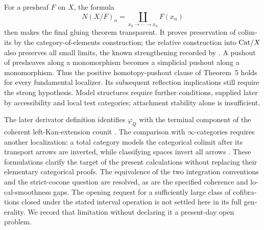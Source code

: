 \begin{otherlanguage}{english}
For a presheaf $F$ on $X$, the formula
\[
 N(X/F)_n=\coprod_{x_0\to\cdots\to x_n}F(x_n)
\]
then makes the final gluing theorem transparent. It proves preservation of colimits by the category-of-elements construction; the relative construction into $\mathrm{Cat}/X$ also preserves all small limits, the known strengthening recorded by \citet[Proposition~3.2.12 and Corollary~3.2.13]{Cisinski2006}. A pushout of presheaves along a monomorphism becomes a simplicial pushout along a monomorphism. Thus the positive homotopy-pushout clause of Theorem~5 holds for every fundamental localizer. Its subsequent reflection implications still require the strong hypothesis. Model structures require further conditions, supplied later by accessibility and local test categories; attachment stability alone is insufficient.

The later derivator definition identifies $\varphi_Q$ with the terminal component of the coherent left-Kan-extension counit \citep[Definition~3.9]{Groth2013}. The comparison with $\infty$-categories requires another localization: a total category models the categorical colimit after its transport arrows are inverted, while classifying spaces invert all arrows \citep[Corollary~3.3.4.3]{Lurie2009HTT}. These formulations clarify the target of the present calculations without replacing their elementary categorical proofs. The equivalence of the two integration conventions and the strict-cocone question are resolved, as are the specified coherence and local-smoothness gaps. The opening request for a sufficiently large class of cofibrations closed under the stated interval operation is not settled here in its full generality. We record that limitation without declaring it a present-day open problem.
\end{otherlanguage}
\dgrchunkend
